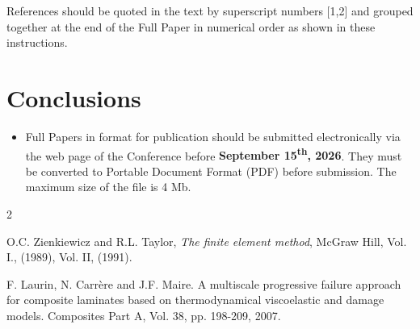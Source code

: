 \documentclass{WCCM-ECCOMAS_2026_Full_Paper}
\begin{document}
References should be quoted in the text by superscript numbers [1,2] and grouped together at the end of the Full Paper in numerical order as shown in these instructions.

\section{Conclusions}

\begin{itemize}
\item Full Papers in format for publication should be submitted electronically via the web page of the Conference before \textbf{September 15\textsuperscript{th}, 2026}. They must be converted to Portable Document Format (PDF) before submission. The maximum size of the file is 4 Mb.
\end{itemize}

\begin{thebibliography}{2}

O.C. Zienkiewicz and R.L. Taylor, \textit{The finite element method}, McGraw Hill, Vol. I., (1989), Vol. II, (1991).

F. Laurin, N. Carr\`ere and J.F. Maire. A multiscale progressive failure approach for composite laminates based on thermodynamical viscoelastic and damage models. Composites Part A, Vol. 38, pp. 198-209, 2007.

\end{thebibliography}
\end{document}
